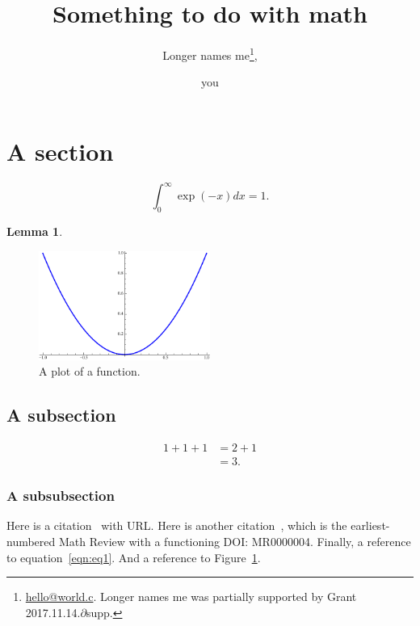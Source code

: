 \documentclass[submission]{FPSAC2022}
\title[Optional shorter title]{Something to do with math}
\author[Optional shorter names]{Longer names me\thanks{\href{mailto:hello@world.c}{hello@world.c}. Longer names me was partially supported by Grant 2017.11.14.$\partial$\;supp.}\addressmark{1}, \and you\addressmark{2}}
\newtheorem{lem}{Lemma}
\begin{document}
\maketitle

\section{A section}

\lipsum[3]

\begin{equation}\label{eqn:eq1}
\int_0^\infty \exp(-x)dx = 1.
\end{equation}

\begin{lem}\label{lem:lem1}
\lipsum[11]
\end{lem}

\lipsum[10]

\begin{figure}
\centering
\includegraphics[width=0.5\textwidth]{plot}
\caption{A plot of a function.}
\label{fig:plot}
\end{figure}

\subsection{A subsection}

\lipsum[5]

\begin{align*}
1 + 1 + 1 &= 2 + 1 \\ &= 3.
\end{align*}

\subsubsection{A subsubsection}

\lipsum[17]

Here is a citation~\cite{greenwade93} with URL. Here is another
citation~\cite{MR4}, which is the earliest-numbered Math Review with a
functioning DOI: MR0000004. Finally, a reference to
equation~\eqref{eqn:eq1}. And a reference to Figure~\ref{fig:plot}.

\acknowledgements{\lipsum[20]}

\printbibliography
\end{document}
